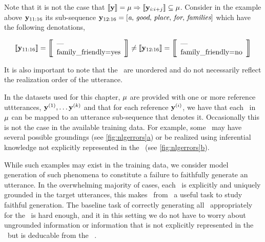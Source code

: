 Note that it is not the case that $\left\llbracket \mathbf{y} \right\rrbracket = \mu \Rightarrow \left\llbracket \mathbf{y}_{i:i+j} \right\rrbracket \subseteq \mu$. Consider in the example above $\mathbf{y}_{11:16}$ its sub-sequence $\mathbf{y}_{12:16} = \left[\textit{a},\,\textit{good},\,\textit{place},\,\textit{for},\,\textit{families}\right]$ which have
the following denotations,
\begin{singlespace}
   \[
   \denotes{\utttoks_{11:16}} = \left[\!\!\left[\begin{array}{l}\textrm{---}\\ \AV{family\_friendly}{yes} \end{array}\right]\!\!\right] \ne \denotes{\utttoks_{12:16}}= \left[\!\!\left[\begin{array}{l}\textrm{---}\\ \AV{family\_friendly}{no} \end{array}\right]\!\!\right] 
       \]
   \end{singlespace}
\noindent It is also important to note that the \attributevalues~are
unordered and do not necessarily reflect the realization order of the 
utterance. 


   In the datasets used for this chapter, $\mu$ are provided with one or more reference uttterances, $\mathbf{y}^{(1)}, \ldots \mathbf{y}^{(k)}$ and that for each reference $\mathbf{y}^{(i)}$, we have that each 
\attributevalue~in $\mu$ can be mapped to an 
utterance sub-sequence that denotes it.
Occasionally this is not the case in the available
training data. For example, some \attributevalues~may have several possible
groundings (see \hyperref[fig:nlgerrors]{\autoref{fig:nlgerrors}a})
or be realized using inferential knowledge not explicitly 
represented in the \meaningrepresentation~(see \hyperref[fig:nlgerrors]{\autoref{fig:nlgerrors}b}). 



While such examples may exist in the training data, 
we consider model 
generation of such phenomena to constitute a failure to faithfully generate
an utterance.  
 In the overwhelming majority of cases, each \attributevalue~is explicitly and uniquely grounded in the 
target utterances, this makes \surfacerealization~from 
\meaningrepresentations~a useful task to study faithful generation. The
baseline task of correctly generating all \attributevalues~appropriately 
for the \dialogueact~is hard enough, and it in this setting we do not have
to worry about ungrounded information or information that is not explicitly
represented in the \meaningrepresentations~but is deducable from
the \meaningrepresentation~\citep{wiseman2017}.  
 




